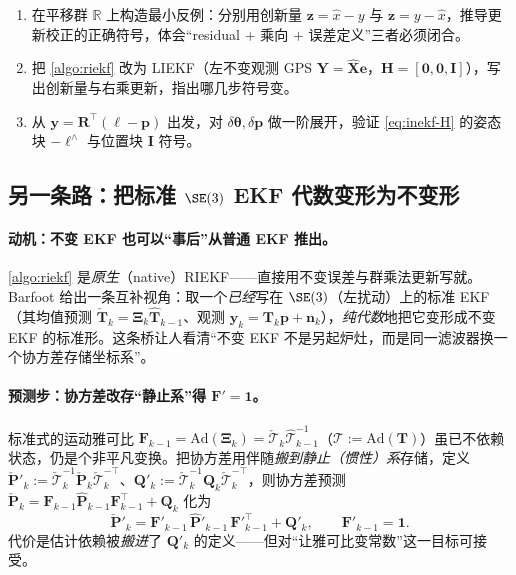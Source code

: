 \begin{practice}
\begin{enumerate}
  \item 在平移群 $\mathbb{R}$ 上构造最小反例：分别用创新量 $\mathbf{z}=\hat{x}-y$ 与 $\mathbf{z}=y-\hat{x}$，推导更新校正的正确符号，体会“residual $+$ 乘向 $+$ 误差定义”三者必须闭合。
  \item 把 \cref{algo:riekf} 改为 LIEKF（左不变观测 GPS $\mathbf{Y}=\hat{\mathbf{X}}\mathbf{e}$，$\mathbf{H}=[\mathbf{0},\mathbf{0},\mathbf{I}]$），写出创新量与右乘更新，指出哪几步符号变。
  \item 从 $\mathbf{y}=\mathbf{R}^\top(\boldsymbol{\ell}-\mathbf{p})$ 出发，对 $\delta\boldsymbol{\theta},\delta\mathbf{p}$ 做一阶展开，验证 \cref{eq:inekf-H} 的姿态块 $-\boldsymbol{\ell}^\wedge$ 与位置块 $\mathbf{I}$ 符号。
\end{enumerate}
\end{practice}

\subsection{另一条路：把标准 \texorpdfstring{$\SE(3)$}{SE(3)} EKF 代数变形为不变形}
\label{subsec:c4-bridge}

\paragraph{动机：不变 EKF 也可以“事后”从普通 EKF 推出。}
\cref{algo:riekf} 是\emph{原生}（native）RIEKF——直接用不变误差与群乘法更新写就。Barfoot 给出一条互补视角\cite{barfoot2024state}：取一个\emph{已经}写在 $\SE(3)$（左扰动）上的标准 EKF（其均值预测 $\check{\mathbf{T}}_k=\boldsymbol{\Xi}_k\hat{\mathbf{T}}_{k-1}$、观测 $\mathbf{y}_k=\mathbf{T}_k\mathbf{p}+\mathbf{n}_k$），\emph{纯代数}地把它变形成不变 EKF 的标准形。这条桥让人看清“不变 EKF 不是另起炉灶，而是同一滤波器换一个协方差存储坐标系”。

\paragraph{预测步：协方差改存“静止系”得 $\mathbf{F}'=\mathbf{1}$。}
标准式的运动雅可比 $\mathbf{F}_{k-1}=\mathrm{Ad}(\boldsymbol{\Xi}_k)=\check{\boldsymbol{\mathcal{T}}}_k\hat{\boldsymbol{\mathcal{T}}}_{k-1}^{-1}$（$\boldsymbol{\mathcal{T}}:=\mathrm{Ad}(\mathbf{T})$）虽已不依赖状态，仍是个非平凡变换。把协方差用伴随\emph{搬到静止（惯性）系}存储，定义 $\check{\mathbf{P}}'_k:=\check{\boldsymbol{\mathcal{T}}}_k^{-1}\check{\mathbf{P}}_k\check{\boldsymbol{\mathcal{T}}}_k^{-\top}$、$\mathbf{Q}'_k:=\check{\boldsymbol{\mathcal{T}}}_k^{-1}\mathbf{Q}_k\check{\boldsymbol{\mathcal{T}}}_k^{-\top}$，则协方差预测 $\check{\mathbf{P}}_k=\mathbf{F}_{k-1}\hat{\mathbf{P}}_{k-1}\mathbf{F}_{k-1}^\top+\mathbf{Q}_k$ 化为
\begin{equation}
  \check{\mathbf{P}}'_k=\mathbf{F}'_{k-1}\,\hat{\mathbf{P}}'_{k-1}\,\mathbf{F}'^{\top}_{k-1}+\mathbf{Q}'_k,\qquad \mathbf{F}'_{k-1}=\mathbf{1}.
  \label{eq:c4-Fprime}
\end{equation}
代价是估计依赖被\emph{搬进}了 $\mathbf{Q}'_k$ 的定义——但对“让雅可比变常数”这一目标可接受。

